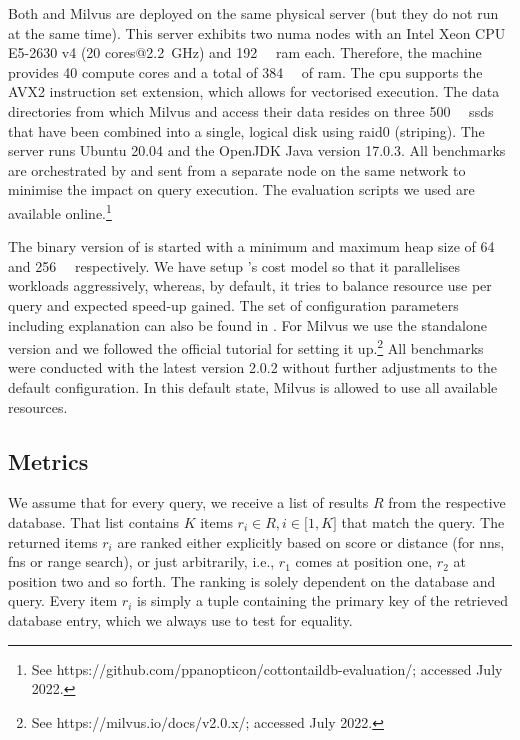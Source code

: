 Both \cottontail{} and Milvus are deployed on the same physical server (but they do not run at the same time). This server exhibits two \acrshort{numa} nodes with an Intel Xeon CPU E5-2630 v4 (20 cores@\SI{2.2}{\giga\hertz}) and \SI{192}{\giga\byte} \acrshort{ram} each. Therefore, the machine provides 40 compute cores and a total of \SI{384}{\giga\byte} of \acrshort{ram}. The \acrshort{cpu} supports the AVX2 instruction set extension, which allows for vectorised execution. The data directories from which Milvus and \cottontail{} access their data resides on three \SI{500}{\giga\byte} \acrshort{ssd}s that have been combined into a single, logical disk using \acrshort{raid}0 (striping). The server runs Ubuntu 20.04 and the OpenJDK Java version 17.0.3. All benchmarks are orchestrated by and sent from a separate node on the same network to minimise the impact on query execution. The evaluation scripts we used are available online.\footnote{See https://github.com/ppanopticon/cottontaildb-evaluation/; accessed July 2022.}

The binary version of \cottontail{} is started with a minimum and maximum heap size of \SI{64}{\giga\byte} and \SI{256}{\giga\byte} respectively. We have setup \cottontail{}'s cost model so that it parallelises workloads aggressively, whereas, by default, it tries to balance resource use per query and expected speed-up gained. The set of configuration parameters including explanation can also be found in . For Milvus we use the standalone version and we followed the official tutorial for setting it up.\footnote{See https://milvus.io/docs/v2.0.x/; accessed July 2022.} All benchmarks were conducted with the latest version 2.0.2 without further adjustments to the default configuration. In this default state, Milvus is allowed to use all available resources.

\subsection{Metrics}

We assume that for every query, we receive a list of results $R$ from the respective database. That list contains $K$ items $r_i \in R, i \in \lbrack 1, K  \rbrack $ that match the query. The returned items $r_i$ are ranked either explicitly based on score or distance (for \acrshort{nns}, \acrshort{fns} or range search), or just arbitrarily, i.e., $r_1$ comes at position one, $r_2$ at position two and so forth. The ranking is solely dependent on the database and query. Every item $r_i$ is simply a tuple containing the primary key of the retrieved database entry, which we always use to test for equality.

